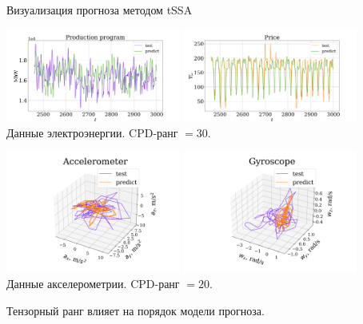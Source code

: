 \documentclass[10pt]{beamer}
\theoremstyle{definition}
\begin{document}
	\begin{frame}{Визуализация прогноза методом tSSA}
		
		\begin{center}
			\includegraphics[width=0.43\textwidth, keepaspectratio]{../../experiments/electricity/tssa/figs/prediction/cpd_rank_30/Production_program.png}
			\includegraphics[width=0.43\textwidth, keepaspectratio]{../../experiments/electricity/tssa/figs/prediction/cpd_rank_30/Price.png} \\
			{\small Данные электроэнергии. CPD-ранг $ = 30 $.} \\ \vspace{0.2cm}
			
			\includegraphics[width=0.43\textwidth, keepaspectratio]{../../experiments/motion_1/tssa/figs/prediction/cpd_rank_20/acceler.png}
			\includegraphics[width=0.43\textwidth, keepaspectratio]{../../experiments/motion_1/tssa/figs/prediction/cpd_rank_20/gyro.png} \\
			{\small Данные акселерометрии. CPD-ранг $ = 20 $.} \\
		\end{center}
		
		Тензорный ранг влияет на порядок модели прогноза.
		
	\end{frame}
	
\end{document}
